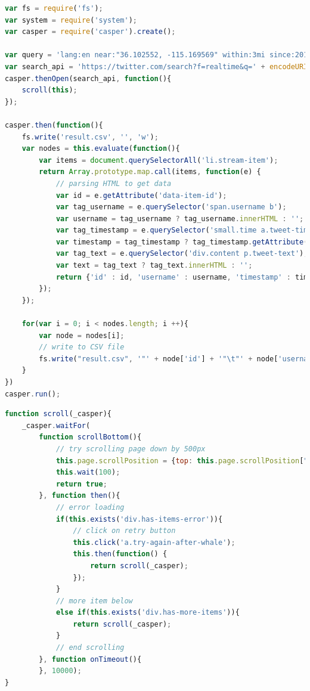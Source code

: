 \clearpage
\begin{lstlisting}[language=JavaScript,caption=Crawling Twitter Advanced Search with CasperJS,label=lst:crawler]
var fs = require('fs');
var system = require('system');
var casper = require('casper').create();

var query = 'lang:en near:"36.102552, -115.169569" within:3mi since:2014-05-01 until:2014-05-07';
var search_api = 'https://twitter.com/search?f=realtime&q=' + encodeURIComponent(query) + '&src=typd';
casper.thenOpen(search_api, function(){
	scroll(this);
});

casper.then(function(){
	fs.write('result.csv', '', 'w');
	var nodes = this.evaluate(function(){
		var items = document.querySelectorAll('li.stream-item');
		return Array.prototype.map.call(items, function(e) {
			// parsing HTML to get data
			var id = e.getAttribute('data-item-id');
			var tag_username = e.querySelector('span.username b');
			var username = tag_username ? tag_username.innerHTML : '';	
			var tag_timestamp = e.querySelector('small.time a.tweet-timestamp span'); 
			var timestamp = tag_timestamp ? tag_timestamp.getAttribute('data-time-ms') : '';
			var tag_text = e.querySelector('div.content p.tweet-text');
			var text = tag_text ? tag_text.innerHTML : '';
			return {'id' : id, 'username' : username, 'timestamp' : timestamp, 'text' : text};
		});		
	});

	for(var i = 0; i < nodes.length; i ++){
		var node = nodes[i];
		// write to CSV file
		fs.write("result.csv", '"' + node['id'] + '"\t"' + node['username'] + '"\t"' + node['timestamp'] + '"\t"' + node['text'] + '"\r\n', 'a');	
	}		
})
casper.run();
\end{lstlisting}

\begin{lstlisting}[language=JavaScript,caption=Scrolling down Twitter Advanced Search with CasperJS,label=lst:infiniteScroll]
function scroll(_casper){
	_casper.waitFor(
		function scrollBottom(){
			// try scrolling page down by 500px
			this.page.scrollPosition = {top: this.page.scrollPosition["top"] + 500, left: 0};
			this.wait(100);
			return true;
		}, function then(){
			// error loading
			if(this.exists('div.has-items-error')){
				// click on retry button
				this.click('a.try-again-after-whale');
				this.then(function() {
					return scroll(_casper);
				});
			}
			// more item below 
			else if(this.exists('div.has-more-items')){
				return scroll(_casper);
			}
			// end scrolling
		}, function onTimeout(){
		}, 10000);
}
\end{lstlisting}

